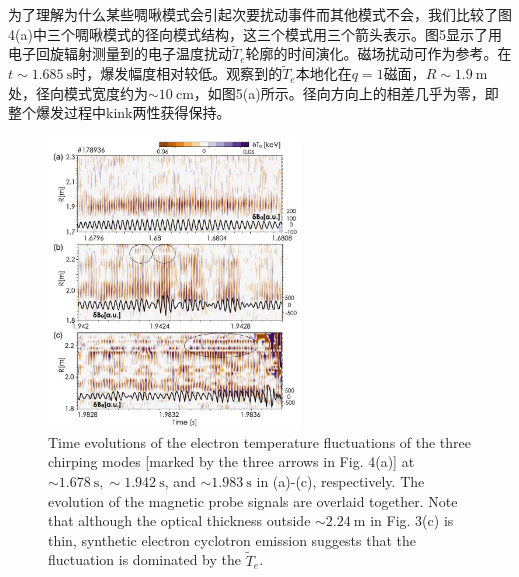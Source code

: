 \documentclass[oneside,onecolumn]{article}
\begin{document}
\begin{sloppypar}
 为了理解为什么某些啁啾模式会引起次要扰动事件而其他模式不会，我们比较了图4(a)中三个啁啾模式的径向模式结构，这三个模式用三个箭头表示。图5显示了用电子回旋辐射测量到的电子温度扰动$\tilde{T}_{e}$轮廓的时间演化。磁场扰动可作为参考。在$t\sim1.685\mathrm{~s}$时，爆发幅度相对较低。观察到的$\tilde{T}_{e}$本地化在$q=1$磁面，$R\sim1.9\mathrm{~m}$处，径向模式宽度约为$\sim 10 \mathrm{~cm}$，如图5(a)所示。径向方向上的相差几乎为零，即整个爆发过程中kink两性获得保持。
  \begin{figure}[htbp]
  	\centering
  	\includegraphics[max width=0.6\textwidth,max height=1.0\textheight]{2023_06_19_f8dbb752866ca158c73eg-4}
  	\caption{Time evolutions of the electron temperature fluctuations of the three chirping modes [marked by the three arrows in Fig. 4(a)] at $\sim 1.678 \mathrm{~s}, \sim 1.942 \mathrm{~s}$, and $\sim 1.983 \mathrm{~s}$ in (a)-(c), respectively. The evolution of the magnetic probe signals are overlaid together. Note that although the optical thickness outside $\sim 2.24 \mathrm{~m}$ in Fig. 3(c) is thin, synthetic electron cyclotron emission suggests that the fluctuation is dominated by the $\tilde{T}_{e}$.}
  	\label{figure5}
  \end{figure}
  

\end{sloppypar}
\end{document}
